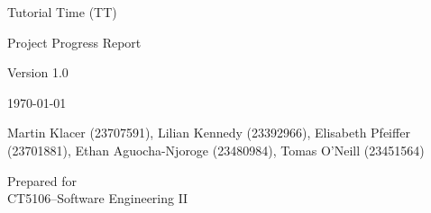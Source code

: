 \documentclass[12pt, a4paper]{article}
\begin{document}
\begin{titlepage}
    \centering
    \vspace*{4cm}
    {\Large Tutorial Time (TT)  \par}
    \vspace{2cm}
    {\Large Project Progress Report \par}
    \vspace{0.5cm}
    {\Large Version 1.0 \par}
    \vspace{0.5cm}
    {\Large \today \par}
    \vspace{2cm}
    {\Large Martin Klacer (23707591), Lilian Kennedy (23392966), Elisabeth Pfeiffer (23701881), Ethan Aguocha-Njoroge (23480984), Tomas O'Neill (23451564)\par}
    \vfill

    Prepared for\\
    CT5106--Software Engineering II\par

\end{titlepage}

\newpage








\end{document}
